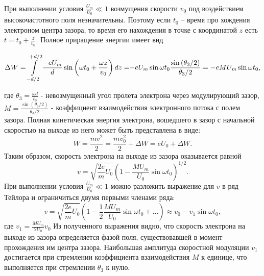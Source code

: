 \documentclass[a4paper,14pt]{extarticle}
\begin{document}
При выполнении условия 
$\frac { U _ { m } } { U _ { 0 } } \ll 1$ возмущения скорости $v_0$ под воздействием высокочастотного поля незначительны. Поэтому если $t_0$ -- время про­
хождения электроном центра зазора, то время его нахождения в точке с координатой $z$ есть $t = t _ { 0 } + \frac { z } { v _ { 0 } }$. Полное приращение энергии имеет вид

\begin{equation}
   { \Delta W = \int\limits _ { - d / 2 }^{{ + d / 2 }} \frac { - e U _ { m } } { d } \sin \left( \omega t _ { 0 } + \frac { \omega z } { v _ { 0 } } \right) d z = } \\ 
   { - e U _ { m } \sin \omega t _ { 0 } \frac { \sin \left( \theta _ { 3 } / 2 \right) } { \theta_ { 3 } / 2 } = - e M U _ { m } \sin \omega t _ { 0 }, } 
\end{equation}

где $\theta _ { 3 } = \frac { \omega d } { t _ { 0 } }$ - невозмущенный угол пролета электрона через модулирующий зазор, $M = \frac { \sin \left( \theta _ { 3 } / 2 \right) } { \theta _ { 3 } / 2 }$ - коэффициент взаимодействия электронного потока с полем зазора. Полная кинетическая энергия электрона, вошедшего в зазор с начальной скоростью на выходе из него может быть представлена в виде:
\begin{equation}
  W = \frac { m v ^ { 2 } } { 2 } = \frac { m v_0 ^ { 2 } } { 2 } + \Delta W = e U _ { 0 } + \Delta W.
\end{equation}
Таким образом, скорость электрона на выходе из зазора оказывается равной
\begin{equation}
  v = \sqrt { \frac { 2 e } { m } U _ { 0 } } \left( 1 - \frac { M U _ { m } } { U _ { 0 } } \sin \omega t _ { 0 } \right) ^ { 1 / 2 }.
\end{equation}
При выполнении условия $\frac { U _ { m } } { U _ { 0 } } \ll 1$ можно разложить выражение для $v$ в ряд Тейлора и ограничиться двумя первыми членами ряда:
\begin{equation}
  v = \sqrt { \frac { 2 e } { m } U _ { 0 } } \left( 1 - \frac { 1 } { 2 } \frac { M U _ { m } } { U _ { 0 } } \sin \omega t _ { 0 } + \ldots \right) \approx v _ { 0 } - v _ { 1 } \sin \omega t _ { 0 },
\end{equation} где $v _ { 1 } = \frac { M U _ { m } } { 2 U _ { 0 } } v _ { 0 }$
Из полученного выражения видно, что скорость электро­на на выходе из зазора определяется фазой поля, существовавшей в момент прохождения им центра зазора. Наибольшая амплитуда скоростной модуляции $v_1$ достигается при стремлении коэффициента взаимодействия $M$ к единице, что выполняется при стремлении $\theta_3$ к нулю.
\end{document}
